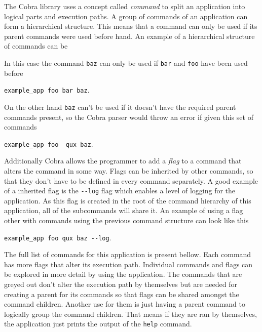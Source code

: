 The Cobra library uses a concept called \textit{command} to split an application into logical parts and execution paths. A group of commands of an application can form a hierarchical structure. This means that a command can only be used if its parent commands were used before hand. An example of a hierarchical structure of commands can be

\vspace{0.5em}
\vspace{0.5em}

\noindent In this case the command \texttt{baz} can only be used if \texttt{bar} and \texttt{foo} have been used before
\begin{center}
  \texttt{example\_app foo bar baz}.
\end{center}
On the other hand \texttt{baz} can't be used if it doesn't have the required parent commands present, so the Cobra parser would throw an error if given this set of commands
\begin{center}
  \texttt{example\_app foo {\color{red} qux} baz}.
\end{center}
Additionally Cobra allows the programmer to add a \textit{flag} to a command that alters the command in some way. Flags can be inherited by other commands, so that they don't have to be defined in every command separately. A good example of a inherited flag is the \texttt{-\--log} flag which enables a level of logging for the application. As this flag is created in the root of the command hierarchy of this application, all of the subcommands will share it. An example of using a flag other with commands using the previous command structure can look like this
\begin{center}
  \texttt{example\_app foo qux baz -\--log}.
\end{center}

The full list of commands for this application is present bellow. Each command has more flags that alter its execution path. Individual commands and flags can be explored in more detail by using the application. The commands that are greyed out don't alter the execution path by themselves but are needed for creating a parent for its commands so that flags can be shared amongst the command children. Another use for them is just having a parent command to logically group the command children. That means if they are ran by themselves, the application just prints the output of the \texttt{help} command.

\vspace{0.5em}



